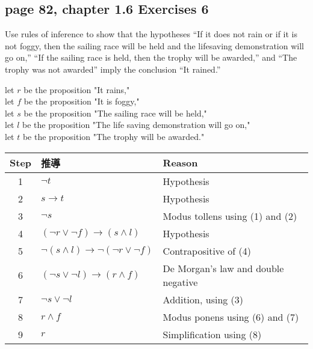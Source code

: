 \documentclass[sigconf]{acmart}
\begin{document}
\subsection{page 82, chapter 1.6 Exercises 6}
\begin{shaded}
    Use rules of inference to show that the hypotheses “If it does not rain or if it is not foggy, then the sailing race will be held and the lifesaving demonstration will go on,” “If the sailing race is held, then the trophy will be awarded,” and “The trophy was not awarded” imply the conclusion “It rained.”
\end{shaded} 
let $r$ be the proposition "It rains," \\
let $f$ be the proposition "It is foggy," \\
let $s$ be the proposition "The sailing race will be held," \\
let $l$ be the proposition "The life saving demonstration will go on," \\
let $t$ be the proposition "The trophy will be awarded." 
\begin{table}[h]
	\centering
	\begin{tabular}{|c|l|l|}
    	\hline
     Step & 推導                 & Reason \\ \hline
    	1 & $ \neg t $           & Hypothesis \\
    	2 & \underline{$s \rightarrow t$}  & Hypothesis \\
    	3 & $ \neg s $       & Modus tollens using (1) and (2) \\
    	4 & $ (\neg r \lor \neg f) \rightarrow (s \land l)$ & Hypothesis \\
    	5 & \underline{$\neg(s \land l) \rightarrow \neg(\neg r \lor \neg f)$}  & Contrapositive of (4) \\
    	6 & \underline{$(\neg s \lor \neg l) \rightarrow ( r \land f)$}  & De Morgan's law and double negative \\
    	7 & \underline{$\neg s \lor \neg l$}  & Addition, using (3) \\
    	8 & \underline{$r \land f$}  & Modus ponens using (6) and (7) \\
    	9 & \underline{$r$}  & Simplification using (8) \\ \hline
	\end{tabular}
\end{table}

\end{document}
